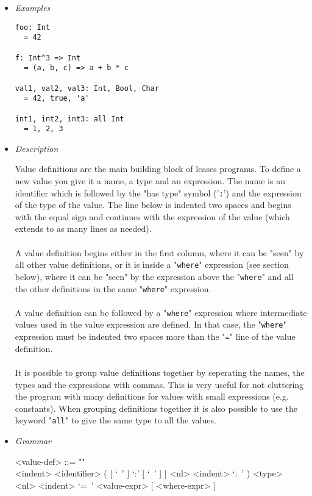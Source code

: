 \documentclass{article}
\begin{document}
\begin{itemize}

\item \textit{Examples}

\begin{verbatim}
foo: Int
  = 42

f: Int^3 => Int
  = (a, b, c) => a + b * c

val1, val2, val3: Int, Bool, Char
  = 42, true, 'a'

int1, int2, int3: all Int
  = 1, 2, 3
\end{verbatim}

\item \textit{Description}

Value definitions are the main building block of lcases programs. To define a
new value you give it a name, a type and an expression. The name is an
identifier which is followed by the "has type" symbol ('\verb|:|') and the
expression of the type of the value. The line below is indented two spaces and
begins with the equal sign and continues with the expression of the value
(which extends to as many lines as needed).
\\\\
A value definition begins either in the first column, where it can be "seen" by
all other value definitions, or it is inside a "\verb|where|" expression (see
section below), where it can be "seen" by the expression above the
"\verb|where|" and all the other definitions in the same "\verb|where|"
expression.
\\\\
A value definition can be followed by a "\verb|where|" expression where
intermediate values used in the value expression are defined. In that case, the
"\verb|where|" expression must be indented two spaces more than the "\verb|=|"
line of the value definition.
\\\\
It is possible to group value definitions together by seperating the names, the
types and the expressions with commas. This is very useful for not cluttering
the program with many definitions for values with small expressions (e.g.
constants).  When grouping definitions together it is also possible to use the
keyword "\verb|all|" to give the same type to all the values.

\item \textit{Grammar}
\begin{grammar}
<value-def> ::= ""\\
<indent> <identifier> 
( [ `\ ' ] `:' [ `\ ' ] | <nl> <indent> `:\ ' ) <type>  \\
<nl> <indent> `=\ ' <value-expr> [ <where-expr> ]


\end{grammar}
\end{itemize}
\end{document}
